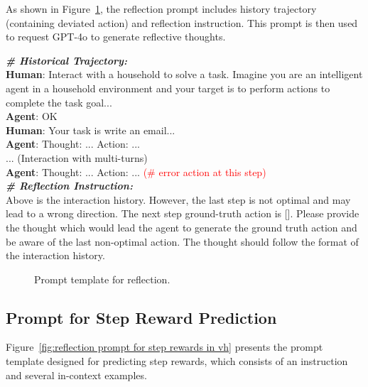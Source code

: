 As shown in Figure~\ref{fig:reflection prompt for virtualhome}, the reflection prompt includes history trajectory (containing deviated action) and reflection instruction. This prompt is then used to request GPT-4o to generate reflective thoughts.


\begin{tcolorbox}[breakable,title=Reflection Prompt]
\textbf{\textit{\# Historical Trajectory:}} \\
\textbf{Human}: Interact with a household to solve a task. Imagine you are an intelligent agent in a household environment and your target is to perform actions to complete the task goal...\\
\textbf{Agent}: OK\\
\textbf{Human}: Your task is write an email... \\
\textbf{Agent}: Thought: ... Action: ... \\
... (Interaction with multi-turns)\\
\textbf{Agent}: Thought: ... Action: ... \textcolor{red}{(\# error action at this step)} \\

  
\textbf{\textit{\# Reflection Instruction:}} \\
Above is the interaction history. However, the last step is not optimal and may lead to a wrong direction. The next step ground-truth action is [\textcolor{blue}{}]. Please provide the thought which would lead the agent to generate the ground truth action and be aware of the last non-optimal action. The thought should follow the format of the interaction history.

\end{tcolorbox}
\begin{figure}[ht]
    \centering
    \vspace{-8pt}
    \caption{
    Prompt template for reflection.
    }
    \label{fig:reflection prompt for virtualhome}
\end{figure}


\subsection{Prompt for Step Reward Prediction}
\label{appdendix: reflection prompt for step rewards}
Figure~\ref{fig:reflection prompt for step rewards in vh} presents the prompt template designed for predicting step rewards, which consists of an instruction and several in-context examples.

